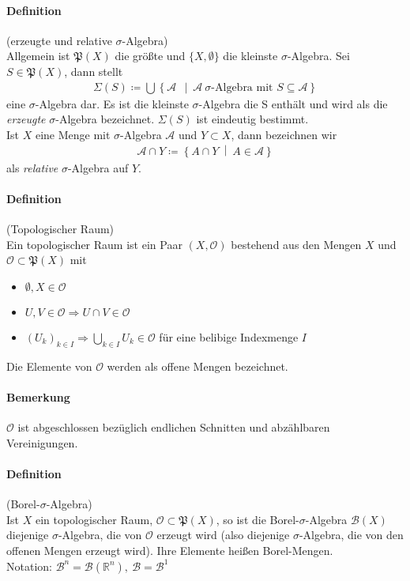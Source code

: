 \documentclass[12pt,a4paper,fleqn]{article}
\def\set#1{{\left\{ #1 \right\}}}
\def\Mid{\ \middle|\ }
\begin{document}
\paragraph{Definition}(erzeugte und relative $\sigma$-Algebra)\\
Allgemein ist $\mathfrak{P}(X)$ die größte und $\{X, \emptyset\}$ die kleinste $\sigma$-Algebra. Sei $S \in \mathfrak{P}(X)$, dann stellt
\begin{align*}
\Sigma(S) \coloneqq \bigcup \set{\mathcal{A}\ \Mid \mathcal{A}\ \sigma\text{-Algebra mit }S \subseteq \mathcal{A}}
\end{align*}
eine $\sigma$-Algebra dar. Es ist die kleinste $\sigma$-Algebra die S enthält und wird als die \textit{erzeugte} $\sigma$-Algebra bezeichnet. $\Sigma(S)$ ist eindeutig bestimmt.\\
Ist $X$ eine Menge mit $\sigma$-Algebra $\mathcal{A}$ und $Y \subset X$, dann bezeichnen wir 
\begin{align*}
\mathcal{A} \cap Y \coloneqq \set{A \cap Y \Mid A \in \mathcal{A}}
\end{align*}
als \textit{relative} $\sigma$-Algebra auf $Y$.

\paragraph{Definition}(Topologischer Raum)\\
Ein topologischer Raum ist ein Paar $(X, \mathcal{O})$ bestehend aus den Mengen $X$ und $\mathcal{O} \subset \mathfrak{P}(X)$ mit
\begin{itemize}
\item $\emptyset, X \in \mathcal{O}$
\item $U, V \in \mathcal{O} \Rightarrow U \cap V \in \mathcal{O}$
\item $(U_k)_{k \in I} \Rightarrow \bigcup_{k \in I} U_k \in \mathcal{O}$
für eine belibige Indexmenge $I$
\end{itemize} 
Die Elemente von $\mathcal{O}$ werden als offene Mengen bezeichnet.

\paragraph{Bemerkung} $\mathcal{O}$ ist abgeschlossen bezüglich endlichen Schnitten und abzählbaren Vereinigungen.

\paragraph{Definition}(Borel-$\sigma$-Algebra)\\
Ist $X$ ein topologischer Raum, $\mathcal{O} \subset \mathfrak{P}(X)$, so ist die Borel-$\sigma$-Algebra $\mathcal{B}(X)$ diejenige $\sigma$-Algebra, die von $\mathcal{O}$ erzeugt wird (also diejenige $\sigma$-Algebra, die von den offenen Mengen erzeugt wird). Ihre Elemente heißen Borel-Mengen.\\
Notation:
$\mathcal{B}^n=\mathcal{B}(\mathbb{R}^n),\ \mathcal{B}=\mathcal{B}^1$
\end{document}
